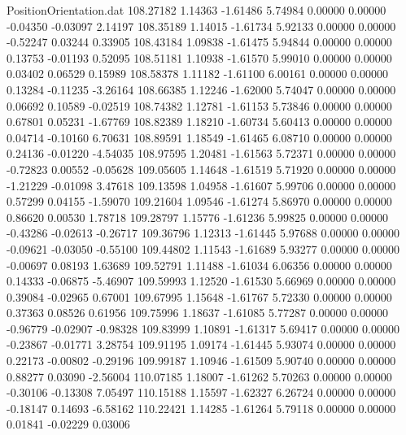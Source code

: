 \begin{filecontents}{PositionOrientation.dat}
 108.27182    1.14363   -1.61486     5.74984    0.00000    0.00000   -0.04350   -0.03097    2.14197
 108.35189    1.14015   -1.61734     5.92133    0.00000    0.00000   -0.52247    0.03244    0.33905
 108.43184    1.09838   -1.61475     5.94844    0.00000    0.00000    0.13753   -0.01193    0.52095
 108.51181    1.10938   -1.61570     5.99010    0.00000    0.00000    0.03402    0.06529    0.15989
 108.58378    1.11182   -1.61100     6.00161    0.00000    0.00000    0.13284   -0.11235   -3.26164
 108.66385    1.12246   -1.62000     5.74047    0.00000    0.00000    0.06692    0.10589   -0.02519
 108.74382    1.12781   -1.61153     5.73846    0.00000    0.00000    0.67801    0.05231   -1.67769
 108.82389    1.18210   -1.60734     5.60413    0.00000    0.00000    0.04714   -0.10160    6.70631
 108.89591    1.18549   -1.61465     6.08710    0.00000    0.00000    0.24136   -0.01220   -4.54035
 108.97595    1.20481   -1.61563     5.72371    0.00000    0.00000   -0.72823    0.00552   -0.05628
 109.05605    1.14648   -1.61519     5.71920    0.00000    0.00000   -1.21229   -0.01098    3.47618
 109.13598    1.04958   -1.61607     5.99706    0.00000    0.00000    0.57299    0.04155   -1.59070
 109.21604    1.09546   -1.61274     5.86970    0.00000    0.00000    0.86620    0.00530    1.78718
 109.28797    1.15776   -1.61236     5.99825    0.00000    0.00000   -0.43286   -0.02613   -0.26717
 109.36796    1.12313   -1.61445     5.97688    0.00000    0.00000   -0.09621   -0.03050   -0.55100
 109.44802    1.11543   -1.61689     5.93277    0.00000    0.00000   -0.00697    0.08193    1.63689
 109.52791    1.11488   -1.61034     6.06356    0.00000    0.00000    0.14333   -0.06875   -5.46907
 109.59993    1.12520   -1.61530     5.66969    0.00000    0.00000    0.39084   -0.02965    0.67001
 109.67995    1.15648   -1.61767     5.72330    0.00000    0.00000    0.37363    0.08526    0.61956
 109.75996    1.18637   -1.61085     5.77287    0.00000    0.00000   -0.96779   -0.02907   -0.98328
 109.83999    1.10891   -1.61317     5.69417    0.00000    0.00000   -0.23867   -0.01771    3.28754
 109.91195    1.09174   -1.61445     5.93074    0.00000    0.00000    0.22173   -0.00802   -0.29196
 109.99187    1.10946   -1.61509     5.90740    0.00000    0.00000    0.88277    0.03090   -2.56004
 110.07185    1.18007   -1.61262     5.70263    0.00000    0.00000   -0.30106   -0.13308    7.05497
 110.15188    1.15597   -1.62327     6.26724    0.00000    0.00000   -0.18147    0.14693   -6.58162
 110.22421    1.14285   -1.61264     5.79118    0.00000    0.00000    0.01841   -0.02229    0.03006

\end{filecontents}
